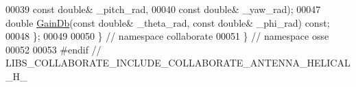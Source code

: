 \begin{DoxyCode}
00039                  \textcolor{keyword}{const} \textcolor{keywordtype}{double}& \_pitch\_rad,
00040                  \textcolor{keyword}{const} \textcolor{keywordtype}{double}& \_yaw\_rad);
00047   \textcolor{keywordtype}{double} \hyperlink{classosse_1_1collaborate_1_1_antenna_helical_ac405a2e34ec76610b88d8f1fb407658d}{GainDb}(\textcolor{keyword}{const} \textcolor{keywordtype}{double}& \_theta\_rad, \textcolor{keyword}{const} \textcolor{keywordtype}{double}& \_phi\_rad) \textcolor{keyword}{const};
00048 \};
00049 
00050 \}  \textcolor{comment}{// namespace collaborate}
00051 \}  \textcolor{comment}{// namespace osse}
00052 
00053 \textcolor{preprocessor}{#endif  // LIBS\_COLLABORATE\_INCLUDE\_COLLABORATE\_ANTENNA\_HELICAL\_H\_}
\end{DoxyCode}
